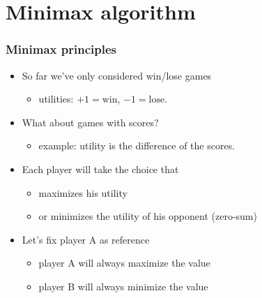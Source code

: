 \documentclass[12pt]{beamer}
\begin{document}
\section{Minimax algorithm}
\begin{frame}
\frametitle{Minimax principles}
\begin{itemize}
\item So far we've only considered win/lose games
\begin{itemize} \item utilities: $+1 = \mbox{win}$, $-1 = \mbox{lose}$. \end{itemize}
\item What about games with scores?
\begin{itemize} \item example: utility is the difference of the scores. \end{itemize}
\item Each player will take the choice that
    \begin{itemize}
    \item maximizes his utility
    \item or minimizes the utility of his opponent (zero-sum)
    \end{itemize}
\item Let's fix player A as reference
    \begin{itemize}
    \item player A will always maximize the value
    \item player B will always minimize the value
    \end{itemize}
\end{itemize}
\end{frame}
\end{document}
